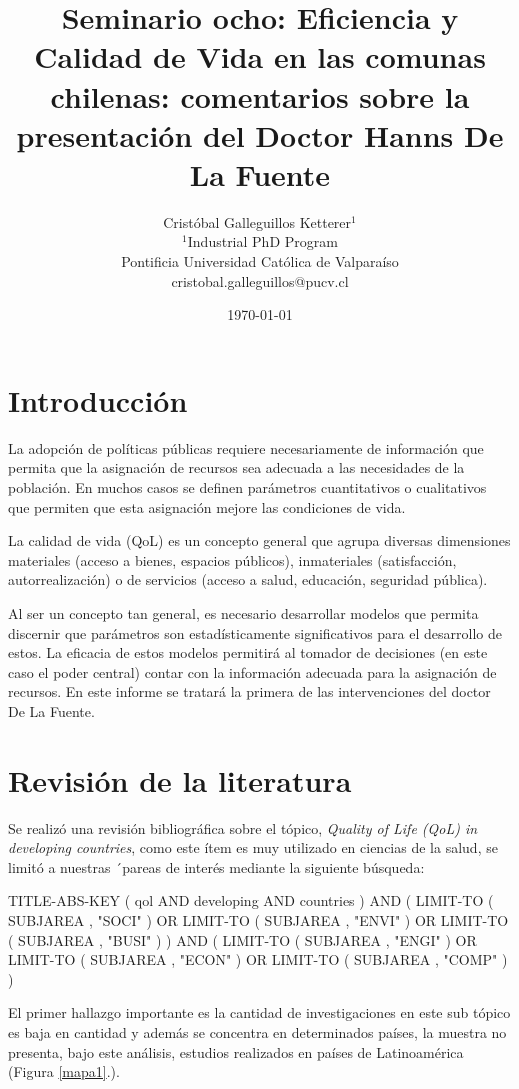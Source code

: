 \documentclass{article}
\title{Seminario ocho: Eficiencia y Calidad de Vida en las comunas chilenas: comentarios sobre la presentación del Doctor Hanns De La Fuente}
\author{Cristóbal Galleguillos Ketterer$^{1}$\\
\small{$^{1}$Industrial PhD Program}\\
\small{Pontificia Universidad Católica de Valparaíso}\\
\small{cristobal.galleguillos@pucv.cl}
}
\date{\small{\today}}
\begin{document}
\maketitle

\section{Introducción}

La adopción de políticas públicas requiere necesariamente de información que permita que la asignación de recursos sea adecuada a las necesidades de la población. En muchos casos se definen parámetros cuantitativos o cualitativos que permiten que esta asignación mejore las condiciones de vida.

La calidad de vida (QoL) es un concepto general que agrupa diversas dimensiones materiales (acceso a bienes, espacios públicos), inmateriales (satisfacción, autorrealización) o de servicios (acceso a salud, educación, seguridad pública).

Al ser un concepto tan general, es necesario desarrollar modelos que permita discernir que parámetros son estadísticamente significativos para el desarrollo de estos. La eficacia de estos modelos permitirá al tomador de decisiones (en este caso el poder central) contar con la información adecuada para la asignación de recursos.
En este informe se tratará la primera de las intervenciones del doctor De La Fuente. 


\section{Revisión de la literatura}

Se realizó una revisión bibliográfica sobre el tópico, \textit{Quality of Life (QoL) in developing countries}, como este ítem es muy utilizado en ciencias de la salud, se limitó a nuestras ´pareas de interés mediante la siguiente búsqueda:

TITLE-ABS-KEY ( qol  AND developing  AND countries )  AND  ( LIMIT-TO ( SUBJAREA ,  "SOCI" )  OR  LIMIT-TO ( SUBJAREA ,  "ENVI" )  OR  LIMIT-TO ( SUBJAREA ,  "BUSI" ) )  AND  ( LIMIT-TO ( SUBJAREA ,  "ENGI" )  OR  LIMIT-TO ( SUBJAREA ,  "ECON" )  OR  LIMIT-TO ( SUBJAREA ,  "COMP" ) )

El primer hallazgo importante es la cantidad de investigaciones en este sub tópico es baja en cantidad y además se concentra en determinados países, la muestra no presenta, bajo este análisis, estudios realizados en países de Latinoamérica (Figura \ref{mapa1}.).
\end{document}
